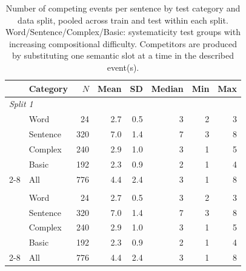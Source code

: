 \begin{table}[t]
\centering\small
\begin{tabular}{@{}llrrrrrr@{}}
\toprule
 & \textbf{Category} & \textbf{$N$} & \textbf{Mean} & \textbf{SD} & \textbf{Median} & \textbf{Min} & \textbf{Max} \\
\midrule
\multicolumn{8}{l}{\textit{Split 1}} \\
\addlinespace[2pt]
 & Word & 24 & 2.7 & 0.5 & 3 & 2 & 3 \\
 & Sentence & 320 & 7.0 & 1.4 & 7 & 3 & 8 \\
 & Complex & 240 & 2.9 & 1.0 & 3 & 1 & 5 \\
 & Basic & 192 & 2.3 & 0.9 & 2 & 1 & 4 \\
\cmidrule(l){2-8}
 & All & 776 & 4.4 & 2.4 & 3 & 1 & 8 \\
\addlinespace
\multicolumn{8}{l}{\textit{Split 2}} \\
\addlinespace[2pt]
 & Word & 24 & 2.7 & 0.5 & 3 & 2 & 3 \\
 & Sentence & 320 & 7.0 & 1.4 & 7 & 3 & 8 \\
 & Complex & 240 & 2.9 & 1.0 & 3 & 1 & 5 \\
 & Basic & 192 & 2.3 & 0.9 & 2 & 1 & 4 \\
\cmidrule(l){2-8}
 & All & 776 & 4.4 & 2.4 & 3 & 1 & 8 \\
\bottomrule
\end{tabular}
\caption{\small Number of competing events per sentence by test category and data split, pooled across train and test within each split. Word/Sentence/Complex/Basic: systematicity test groups with increasing compositional difficulty. Competitors are produced by substituting one semantic slot at a time in the described event(s).}
\label{tab:competing_events_combined}
\end{table}

